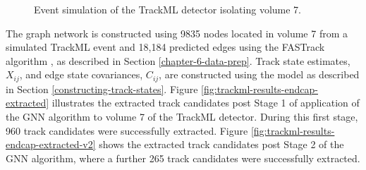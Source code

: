 \begin{figure}[htbp!] 
    \centering
    \hfill%
    \caption{Event simulation of the TrackML detector isolating volume 7.}
    \label{fig:trackml-results-endcap-nodes-sim}
\end{figure}


The graph network is constructed using 9835 nodes located in volume 7 from a simulated TrackML event and 18,184 predicted edges using the FASTrack algorithm \cite{Dmitry-fasttrack-addtest}, as described in Section \ref{chapter-6-data-prep}. Track state estimates, $X_{ij}$, and edge state covariances, $C_{ij}$, are constructed using the model as described in Section \ref{constructing-track-states}. Figure \ref{fig:trackml-results-endcap-extracted} illustrates the extracted track candidates post Stage 1 of application of the GNN algorithm to volume 7 of the TrackML detector. During this first stage, 960 track candidates were successfully extracted. Figure \ref{fig:trackml-results-endcap-extracted-v2} shows the extracted track candidates post Stage 2 of the GNN algorithm, where a further 265 track candidates were successfully extracted.

